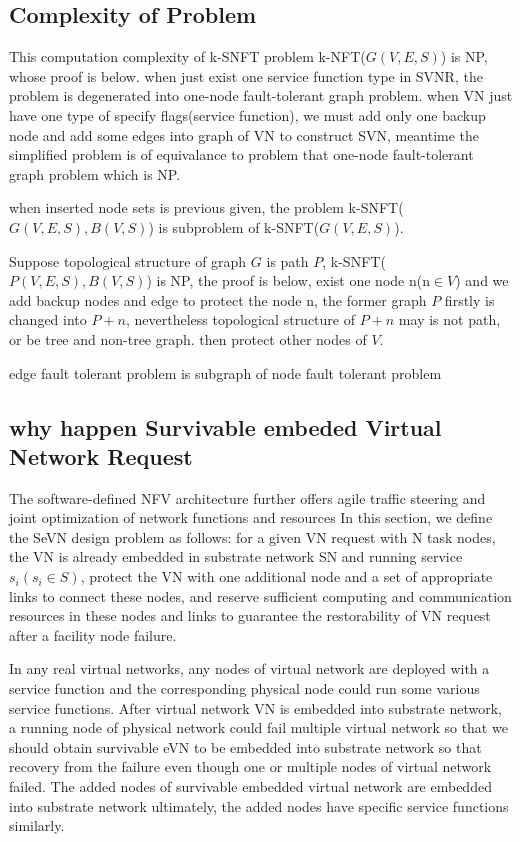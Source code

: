 \subsection{Complexity of Problem}
\label{sec:Complexity}
This computation complexity of k-SNFT problem k-NFT($G(V,E,S)$) is NP, whose proof is below. when just exist one service function type in SVNR, the problem is degenerated into one-node fault-tolerant graph problem. when VN just have one type of specify flags(service function), we must add only one backup node and add some edges into graph of VN to construct SVN, meantime the simplified problem is of equivalance to problem that one-node fault-tolerant graph problem which is NP.

when inserted node sets is previous given, the problem k-SNFT($G(V,E,S),B(V,S)$) is subproblem of k-SNFT($G(V,E,S)$).

Suppose topological structure of graph $G$ is path $P$, k-SNFT($P(V,E,S),B(V,S)$) is NP, the proof is below, exist one node n(n$\in V$) and we add backup nodes and edge to protect the node n, the former graph $P$ firstly is changed into $P+n$, nevertheless topological structure of $P+n$ may is not path, or be tree and non-tree graph. then protect other nodes of $V$.


edge fault tolerant problem is subgraph of node fault tolerant problem

\subsection{why happen Survivable embeded Virtual Network Request}
The software-defined NFV architecture further offers agile traffic steering and joint optimization of network functions and resources In this section, we define the SeVN design problem as follows: for a given VN request with N task nodes, the VN is already embedded in substrate network SN and running service $s_i(s_i\in S)$, protect the VN with one additional node and a set of appropriate links to connect these nodes, and reserve sufficient computing and communication resources in these nodes and links to guarantee the restorability of VN request after a facility node failure.

In any real virtual networks, any nodes of virtual network  are deployed with a service function and the corresponding physical node could run some various service functions. After virtual network VN is embedded into substrate network, a running node of physical network could fail multiple virtual network so that we should obtain survivable eVN to be embedded into substrate network so that recovery from the failure even though one or multiple nodes of virtual network failed. The added nodes of survivable embedded virtual network are embedded into substrate network ultimately, the added nodes have specific service functions similarly.



